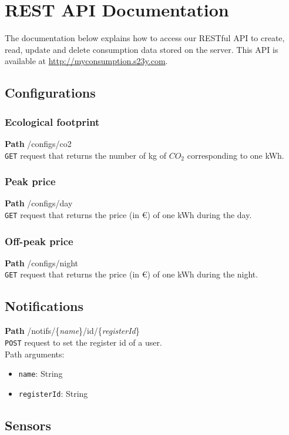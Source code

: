 \documentclass[a4paper, oneside, 11pt]{book}
\begin{document}
\chapter{REST API Documentation}
The documentation below explains how to access our RESTful API to create, read, update and delete consumption data stored on the server. This API is available at \url{http://myconsumption.s23y.com}.

\section*{Configurations}
\subsection*{Ecological footprint}
\textbf{Path} /configs/co2 \\
\texttt{GET} request that returns the number of kg of \(CO_2\) corresponding to one kWh.

\subsection*{Peak price}
\textbf{Path} /configs/day \\
\texttt{GET} request that returns the price (in \euro ) of one kWh during the day.

\subsection*{Off-peak price}
\textbf{Path} /configs/night \\
\texttt{GET} request that returns the price (in \euro ) of one kWh during the night.

\section*{Notifications}
\textbf{Path} /notifs/\{\textit{name}\}/id/\{\textit{registerId}\} \\
\texttt{POST} request to set the register id of a user. \\
Path arguments:
\begin{itemize}
    \item \texttt{name}: String
    \item \texttt{registerId}: String
\end{itemize}

\section*{Sensors}
\end{document}
